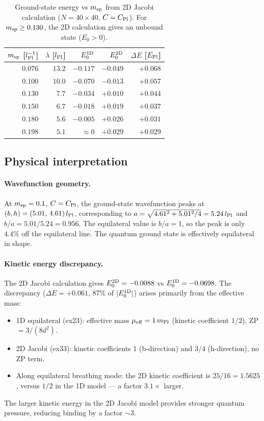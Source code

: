 \begin{table}[h]
\centering
\caption{Ground-state energy vs $m_{\rm sp}$ from 2D Jacobi calculation
($N=40\times40$, $C=C_{\rm Pl}$).  For $m_{\rm sp}\geq0.130$, the 2D
calculation gives an unbound state ($E_0>0$).}
\label{tab:2d_iso_scan}
\begin{tabular}{rrrrr}
\hline
$m_{\rm sp}$ [$l_{\rm Pl}^{-1}$] & $\lambda$ [$l_{\rm Pl}$] &
  $E_0^{\rm 1D}$ & $E_0^{\rm 2D}$ & $\Delta E$ [$E_{\rm Pl}$] \\
\hline
$0.076$ & $13.2$ & $-0.117$ & $-0.049$ & $+0.068$ \\
$0.100$ & $10.0$ & $-0.070$ & $-0.013$ & $+0.057$ \\
$0.130$ & $\ 7.7$ & $-0.034$ & $+0.010$ & $+0.044$ \\
$0.150$ & $\ 6.7$ & $-0.018$ & $+0.019$ & $+0.037$ \\
$0.180$ & $\ 5.6$ & $-0.005$ & $+0.026$ & $+0.031$ \\
$0.198$ & $\ 5.1$ & $\approx0$ & $+0.029$ & $+0.029$ \\
\hline
\end{tabular}
\end{table}

\subsection{Physical interpretation}

\paragraph{Wavefunction geometry.}
At $m_{\rm sp}=0.1$, $C=C_{\rm Pl}$, the ground-state wavefunction peaks at
$(b,h)=(5.01,\,4.61)\,l_{\rm Pl}$, corresponding to
$a=\sqrt{4.61^2+5.01^2/4}=5.24\,l_{\rm Pl}$ and
$b/a = 5.01/5.24 = 0.956$.  The equilateral value is $b/a=1$, so the peak
is only $4.4\%$ off the equilateral line.  The quantum ground state is
effectively equilateral in shape.

\paragraph{Kinetic energy discrepancy.}
The 2D Jacobi calculation gives $E_0^{\rm 2D} = -0.0088$ vs
$E_0^{\rm 1D}=-0.0698$.  The discrepancy ($\Delta E = +0.061$, 87\% of
$|E_0^{\rm 1D}|$) arises primarily from the effective mass:
\begin{itemize}
  \item 1D equilateral (ex23): effective mass $\mu_{\rm eff}=1\,m_{\rm Pl}$
    (kinetic coefficient $1/2$), ZP $= 3/(8d^2)$.
  \item 2D Jacobi (ex33): kinetic coefficients $1$ (b-direction)
    and $3/4$ (h-direction), no ZP term.
  \item Along equilateral breathing mode: the 2D kinetic coefficient is
    $25/16 = 1.5625$, versus $1/2$ in the 1D model — a factor $3.1\times$ larger.
\end{itemize}
The larger kinetic energy in the 2D Jacobi model provides stronger quantum
pressure, reducing binding by a factor $\sim 3$.


